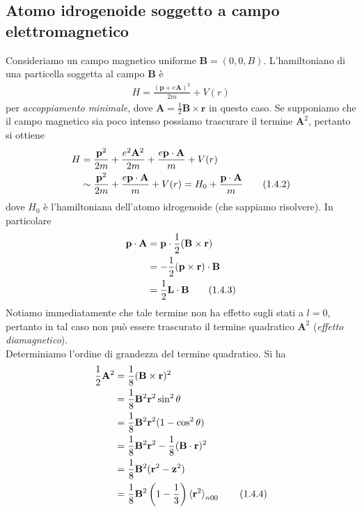 \documentclass{article}
\begin{document}
\newpage
\subsection{Atomo idrogenoide soggetto a campo elettromagnetico}
Consideriamo un campo magnetico uniforme $\mathbf{B} = (0, 0, B)$. L'hamiltoniano di una particella soggetta al campo $\mathbf{B}$ è 
\begin{align}
    H = \frac{(\mathbf{p} + e\mathbf{A})^2}{2m} + V(r) \tag{1.4.1}
\end{align}
per \textit{accoppiamento minimale}, dove $\mathbf{A} = \frac{1}{2}\mathbf{B} \times \mathbf{r}$ in questo caso. Se supponiamo che il campo magnetico sia poco intenso possiamo trascurare il termine $\mathbf{A}^2$, pertanto si ottiene 
\begin{align}
    H &= \frac{\mathbf{p}^2}{2m} + \frac{e^2\mathbf{A}^2}{2m} + \frac{e\mathbf{p} \cdot \mathbf{A}}{m} + V(r) \notag \\
    &\sim \frac{\mathbf{p}^2}{2m} + \frac{e\mathbf{p} \cdot \mathbf{A}}{m} + V(r) = H_0 + \frac{\mathbf{p} \cdot \mathbf{A}}{m} \tag{1.4.2}
\end{align}
dove $H_0$ è l'hamiltoniana dell'atomo idrogenoide (che sappiamo risolvere). In particolare 
\begin{align}
    \mathbf{p} \cdot \mathbf{A} &= \mathbf{p} \cdot \frac{1}{2}(\mathbf{B} \times \mathbf{r}) \notag \\
    &= -\frac{1}{2}(\mathbf{p} \times \mathbf{r}) \cdot \mathbf{B} \notag \\
    &= \frac{1}{2}\mathbf{L} \cdot \mathbf{B} \tag{1.4.3}
\end{align}
Notiamo immediatamente che tale termine non ha effetto sugli stati a $l = 0$, pertanto in tal caso non può essere trascurato il termine quadratico $\mathbf{A}^2$ (\textit{effetto diamagnetico}). \\
Determiniamo l'ordine di grandezza del termine quadratico. Si ha
\begin{align}
    \frac{1}{2}\mathbf{A}^2 &= \frac{1}{8}(\mathbf{B} \times \mathbf{r})^2 \notag \\
    &= \frac{1}{8}\mathbf{B}^2\mathbf{r}^2\sin^2\theta \notag \\
    &= \frac{1}{8}\mathbf{B}^2\mathbf{r}^2(1 - \cos^2\theta) \notag \\
    &= \frac{1}{8}\mathbf{B}^2\mathbf{r}^2 - \frac{1}{8}(\mathbf{B} \cdot \mathbf{r})^2 \notag \\
    &= \frac{1}{8}\mathbf{B}^2(\mathbf{r}^2 - \mathbf{z}^2) \notag \\
    &= \frac{1}{8}\mathbf{B}^2\left(1 - \frac{1}{3}\right)\braket{\mathbf{r}^2}_{n00} \tag{1.4.4} 
\end{align}
\end{document}

